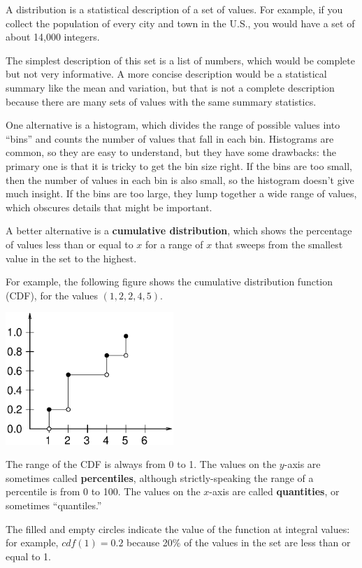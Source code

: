 \documentclass[10pt]{book}
\begin{document}
A distribution is a statistical description of a set of values.
For example, if you collect the population of every city and town
in the U.S., you would have a set of about 14,000 integers.

The simplest description of this set is a list of numbers, which
would be complete but not very informative.  A more concise description
would be a statistical summary like the mean and variation, but
that is not a complete description because there are many sets
of values with the same summary statistics.

One alternative is a histogram, which divides the range of
possible values into ``bins'' and counts the number of values that
fall in each bin.  Histograms are common, so they are
easy to understand, but they have some drawbacks: the primary
one is that it is tricky to get the bin size right.  If the bins
are too small, then the number of values in each bin is also small,
so the histogram doesn't give much insight.  If the bins are
too large, they lump together a wide range of values, which
obscures details that might be important.

A better alternative is a {\bf cumulative distribution}, which shows
the percentage of values less than or equal to $x$ for a range of
$x$ that sweeps from the smallest value in the set to the
highest.

For example, the following figure shows the cumulative distribution
function (CDF), for the values $(1,2,2,4,5)$.

\beforefig
\centerline{\includegraphics[width=2.5in]{figs/cdf.eps}}
\afterfig

The range of the CDF is always from 0 to 1.  The values on the
$y$-axis are sometimes called {\bf percentiles}, although
strictly-speaking the range of a percentile is from 0 to 100.  The
values on the $x$-axis are called {\bf quantities}, or sometimes
``quantiles.''

The filled and empty circles indicate the value
of the function at integral values: for example, $cdf(1) = 0.2$
because 20\% of the values in the set are less than or equal to 1.
\end{document}
